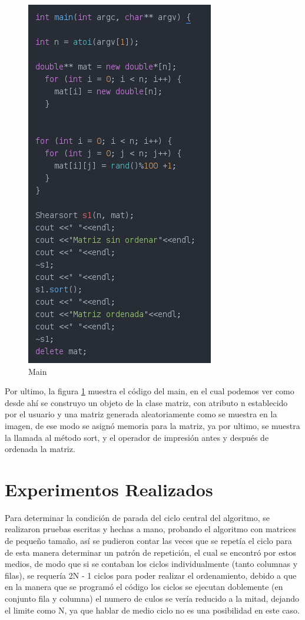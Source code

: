 \documentclass[11pt]{article}
\begin{document}
\begin{figure}[H]
\centering
\includegraphics[scale=1]{main.png}
\caption{Main}
\label{fig:5}
\end{figure}

Por ultimo, la figura \ref{fig:5} muestra el código del main, en el cual podemos ver como desde ahí se construyo un objeto de la clase matriz, con atributo n establecido por el usuario y una matriz generada aleatoriamente como se muestra en la imagen, de ese modo se asignó memoria para la matriz, ya por ultimo, se muestra la llamada al método sort, y el operador de impresión antes y después de ordenada la matriz.

\section{Experimentos Realizados}

Para determinar la condición de parada del ciclo central del algoritmo, se realizaron pruebas escritas y hechas a mano, probando el algoritmo con matrices de pequeño tamaño, así se pudieron contar las veces que se repetía el ciclo para de esta manera determinar un patrón de repetición, el cual se encontró por estos medios, de modo que si se contaban los ciclos individualmente (tanto columnas y filas), se requería 2N - 1 ciclos para poder realizar el ordenamiento, debido a que en la manera que se programó el código los ciclos se ejecutan doblemente (en conjunto fila y columna) el numero de culos se vería reducido a la mitad, dejando el limite como N, ya que hablar de medio ciclo no es una posibilidad en este caso.
\end{document}
